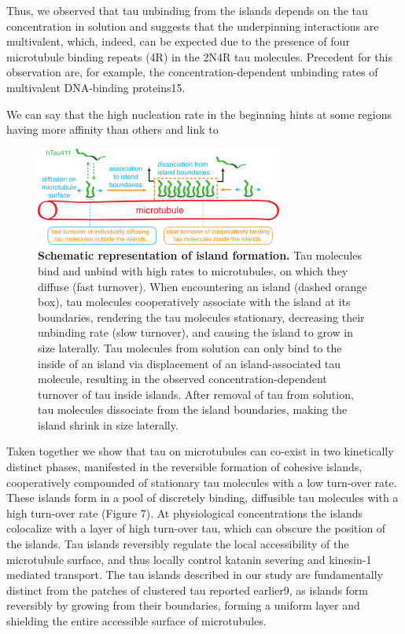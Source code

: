 Thus, we observed that tau unbinding from the islands depends on the tau concentration in solution and suggests that the underpinning interactions are multivalent, which, indeed, can be expected due to the presence of four microtubule binding repeats (4R) in the 2N4R tau molecules. Precedent for this observation are, for example, the concentration-dependent unbinding rates of multivalent DNA-binding proteins15.

We can say that the high nucleation rate in the beginning hints at some regions having more affinity than others and link to \cite{siahaan2022microtubule}

\begin{figure}[h!tb]
\centering
\includegraphics[scale=1]{Figures/tau8.png}
\caption[Schematic representation of island formation.]{
\textbf{Schematic representation of island formation.} Tau molecules bind and unbind with high rates to microtubules, on which they diffuse (fast turnover). When encountering an island (dashed orange box), tau molecules cooperatively associate with the island at its boundaries, rendering the tau molecules stationary, decreasing their unbinding rate (slow turnover), and causing the island to grow in size laterally. Tau molecules from solution can only bind to the inside of an island via displacement of an island-associated tau molecule, resulting in the observed concentration-dependent turnover of tau inside islands. After removal of tau from solution, tau molecules dissociate from the island boundaries, making the island shrink in size laterally.
	}\label{tau8}
\end{figure}
Taken together we show that tau on microtubules can co-exist in two kinetically distinct phases, manifested in the reversible formation of cohesive islands, cooperatively compounded of stationary tau molecules with a low turn-over rate. These islands form in a pool of discretely binding, diffusible tau molecules with a high turn-over rate (Figure 7). At physiological concentrations the islands colocalize with a layer of high turn-over tau, which can obscure the position of the islands. Tau islands reversibly regulate the local accessibility of the microtubule surface, and thus locally control katanin severing and kinesin-1 mediated transport. The tau islands described in our study are fundamentally distinct from the patches of clustered tau reported earlier9, as islands form reversibly by growing from their boundaries, forming a uniform layer and shielding the entire accessible surface of microtubules.
